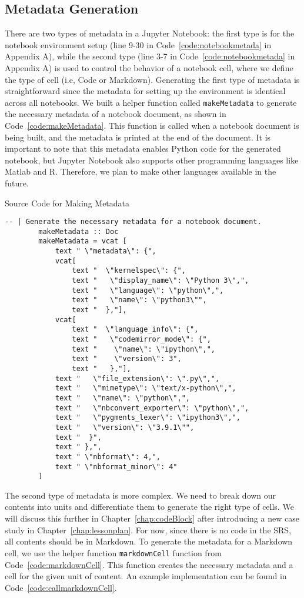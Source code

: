 \subsection{Metadata Generation}
There are two types of metadata in a Jupyter Notebook: the first type is for 
the notebook environment setup (line 9-30 in Code~\ref{code:notebookmetada} in 
Appendix A), while the second type (line 3-7 in Code~\ref{code:notebookmetada} 
in Appendix A) is used to control the behavior of a notebook cell, where we 
define the type of cell (i.e, Code or Markdown). Generating the first type of 
metadata is straightforward since the metadata for setting up the environment 
is identical across all notebooks. We built a helper function called 
\texttt{makeMetadata} to generate the necessary metadata of a notebook 
document, as shown in Code~\ref{code:makeMetadata}. This function is called 
when a notebook document is being built, and the metadata is printed at the end 
of the document. It is important to note that this metadata enables Python 
code for the generated notebook, but Jupyter Notebook also supports other 
programming languages like Matlab and R. Therefore, we plan to make other 
languages available in the future.

\begin{listing}[h!]
	\caption{Source Code for Making Metadata}
	\label{code:makeMetadata}
	\begin{lstlisting}[language=haskell1]
		-- | Generate the necessary metadata for a notebook document.
		makeMetadata :: Doc  
		makeMetadata = vcat [
			text " \"metadata\": {", 
			vcat[
				text "  \"kernelspec\": {", 
				text "   \"display_name\": \"Python 3\",", 
				text "   \"language\": \"python\",",
				text "   \"name\": \"python3\"", 
				text "  },"],
			vcat[
				text "  \"language_info\": {", 
				text "   \"codemirror_mode\": {", 
				text "    \"name\": \"ipython\",",
				text "    \"version\": 3",
				text "   },"],
			text "   \"file_extension\": \".py\",", 
			text "   \"mimetype\": \"text/x-python\",",					
			text "   \"name\": \"python\",",
			text "   \"nbconvert_exporter\": \"python\",",
			text "   \"pygments_lexer\": \"ipython3\",",
			text "   \"version\": \"3.9.1\"",
			text "  }",
			text " },",
			text " \"nbformat\": 4,", 
			text " \"nbformat_minor\": 4" 
		]
	\end{lstlisting}
\end{listing}

The second type of metadata is more complex. We need to break down our contents 
into units and differentiate them to generate the right type of cells. We will 
discuss this further in Chapter~\ref{chap:codeBlock} after introducing a new 
case study in Chapter~\ref{chap:lessonplan}. For now, since there is no code in 
the SRS, all contents should be in Markdown. To generate the metadata for a 
Markdown cell, we use the helper function \texttt{markdownCell} function from 
Code~\ref{code:markdownCell}. This function creates the necessary metadata and 
a cell for the given unit of content. An example implementation can be found in 
Code~\ref{code:callmarkdownCell}.

